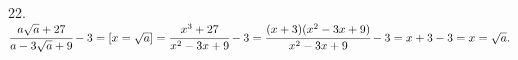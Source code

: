 22. $\cfrac{a\sqrt{a}+27}{a-3\sqrt{a}+9}-3=[x=\sqrt{a}]=\cfrac{x^3+27}{x^2-3x+9}-3=\cfrac{(x+3)(x^2-3x+9)}{x^2-3x+9}-3=x+3-3=x=\sqrt{a}.$\\
